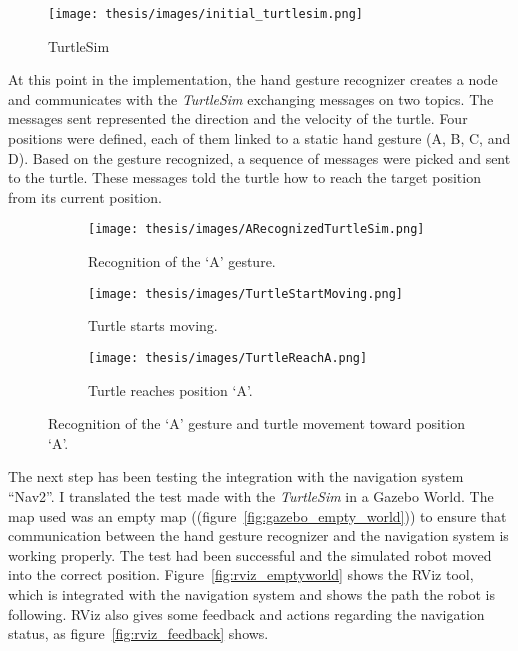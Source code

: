 \documentclass[../thesis.tex]{subfiles}
\begin{document}
\begin{figure}[H]
    \centering
    \texttt{[image: thesis/images/initial\_turtlesim.png]}
    \caption{TurtleSim}
    \label{fig:initial_turtlesim}
\end{figure}

At this point in the implementation, the hand gesture recognizer creates a node and communicates with the \textit{TurtleSim} exchanging messages on two topics. The messages sent represented the direction and the velocity of the turtle. Four positions were defined, each of them linked to a static hand gesture (A, B, C, and D). Based on the gesture recognized, a sequence of messages were picked and sent to the turtle. These messages told the turtle how to reach the target position from its current position.

\begin{figure}[H]
     \centering
     \begin{subfigure}[b]{0.45\textwidth}
         \centering
         \texttt{[image: thesis/images/ARecognizedTurtleSim.png]}
         \caption{Recognition of the `A' gesture.}
         \label{fig:A_gesture_recognition_turtlesim}
     \end{subfigure}
     \hfill
     \begin{subfigure}[b]{0.45\textwidth}
         \centering
         \texttt{[image: thesis/images/TurtleStartMoving.png]}
         \caption{Turtle starts moving.}
         \label{fig:turtle_start_turtle_sim}
     \end{subfigure}
     \hfill
     \begin{subfigure}[b]{0.45\textwidth}
         \centering
         \texttt{[image: thesis/images/TurtleReachA.png]}
         \caption{Turtle reaches position `A'.}
         \label{fig:turtle_reach_A_position.}
     \end{subfigure}
        \caption{Recognition of the `A' gesture and turtle movement toward position `A'.}
        \label{fig:example_to_A_turtlesim}
\end{figure}

The next step has been testing the integration with the navigation system ``Nav2''. I translated the test made with the \textit{TurtleSim} in a Gazebo World. The map used was an empty map ((figure~\ref{fig:gazebo_empty_world})) to ensure that communication between the hand gesture recognizer and the navigation system is working properly. The test had been successful and the simulated robot moved into the correct position. Figure~\ref{fig:rviz_emptyworld} shows the RViz tool, which is integrated with the navigation system and shows the path the robot is following. RViz also gives some feedback and actions regarding the navigation status, as figure~\ref{fig:rviz_feedback} shows.
\end{document}
